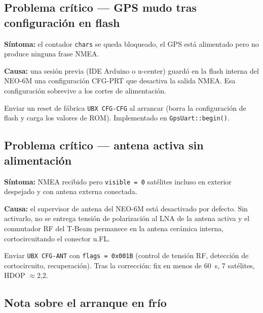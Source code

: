\documentclass[12pt,a4paper]{article}
\newcommand{\file}[1]{\texttt{#1}}
\begin{document}
\subsection{Problema cr\'itico --- GPS mudo tras configuraci\'on en flash}

\begin{warningbox}
  \textbf{S\'intoma:} el contador \texttt{chars} se queda bloqueado, el GPS est\'a
  alimentado pero no produce ninguna frase NMEA.

  \textbf{Causa:} una sesi\'on previa (IDE Arduino o u-center) guard\'o en la flash
  interna del NEO-6M una configuraci\'on CFG-PRT que desactiva la salida NMEA. Esa
  configuraci\'on sobrevive a los cortes de alimentaci\'on.
\end{warningbox}

\begin{okbox}
  Enviar un reset de f\'abrica \texttt{UBX CFG-CFG} al arrancar (borra la
  configuraci\'on de flash y carga los valores de ROM). Implementado en
  \file{GpsUart::begin()}.
\end{okbox}

\subsection{Problema cr\'itico --- antena activa sin alimentaci\'on}
\label{subsec:antena}

\begin{warningbox}
  \textbf{S\'intoma:} NMEA recibido pero \texttt{visible = 0} sat\'elites incluso
  en exterior despejado y con antena externa conectada.

  \textbf{Causa:} el supervisor de antena del NEO-6M est\'a desactivado por
  defecto. Sin activarlo, no se entrega tensi\'on de polarizaci\'on al LNA de la
  antena activa y el conmutador RF del T-Beam permanece en la antena cer\'amica
  interna, cortocircuitando el conector u.FL.
\end{warningbox}

\begin{okbox}
  Enviar \texttt{UBX CFG-ANT} con \texttt{flags = 0x001B} (control de tensi\'on RF,
  detecci\'on de cortocircuito, recuperaci\'on). Tras la correcci\'on: fix en menos
  de 60~s, 7 sat\'elites, HDOP $\approx$2,2.
\end{okbox}

\subsection{Nota sobre el arranque en fr\'io}
\end{document}
